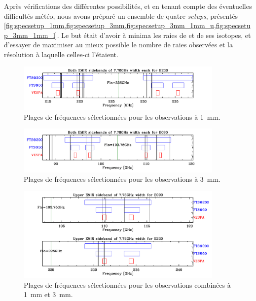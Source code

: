 \documentclass[a4paper,10pt,french]{article}
\newcommand{\troismm}{\SI{3}{\milli\meter}}
\newcommand{\unmm}{\SI{1}{\milli\meter}}
\begin{document}
Après vérifications des différentes possibilités, et en tenant compte des éventuelles
difficultés météo, nous avons préparé un ensemble de quatre \textit{setups},
présentés
\cref{fig:specsetup_1mm,fig:specsetup_3mm,fig:specsetup_3mm_1mm_u,fig:specsetup_3mm_1mm_l}.
Le but était d’avoir à minima les raies de  et de ses isotopes, et
d’essayer de maximiser au mieux possible le nombre de raies observées et la
résolution à laquelle celles-ci l’étaient.

\begin{figure}[ht]
    \centering
    \includegraphics[width=0.9\textwidth]{specsetup-1mm.pdf}
    \caption{Plages de fréquences sélectionnées pour les observations à \unmm.}
    \label{fig:specsetup_1mm}
\end{figure}

\begin{figure}[ht]
    \centering
    \includegraphics[width=0.9\textwidth]{specsetup-3mm.pdf}
    \caption{Plages de fréquences sélectionnées pour les observations à \troismm.}
    \label{fig:specsetup_3mm}
\end{figure}

\begin{figure}[ht]
    \centering
    \includegraphics[width=0.9\textwidth]{specsetup-3mm-1mm-u.pdf}
    \caption{Plages de fréquences sélectionnées pour les observations combinées à \unmm{} et \troismm.}
    \label{fig:specsetup_3mm_1mm_u}
\end{figure}
\end{document}
